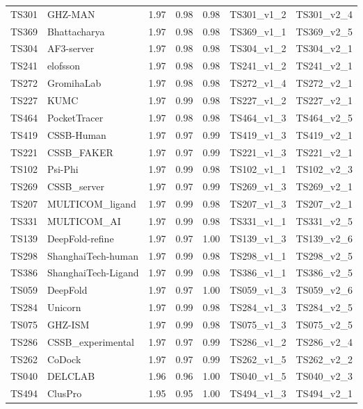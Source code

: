 \begin{table}[ht]
{\begin{tabular}{llrrrll}
TS301 & GHZ-MAN & 1.97 & 0.98 & 0.98 & TS301\_v1\_2 & TS301\_v2\_4 \\ 
TS369 & Bhattacharya & 1.97 & 0.98 & 0.98 & TS369\_v1\_1 & TS369\_v2\_5 \\ 
TS304 & AF3-server & 1.97 & 0.98 & 0.98 & TS304\_v1\_2 & TS304\_v2\_1 \\ 
TS241 & elofsson & 1.97 & 0.98 & 0.98 & TS241\_v1\_2 & TS241\_v2\_1 \\ 
TS272 & GromihaLab & 1.97 & 0.98 & 0.98 & TS272\_v1\_4 & TS272\_v2\_1 \\ 
TS227 & KUMC & 1.97 & 0.99 & 0.98 & TS227\_v1\_2 & TS227\_v2\_1 \\ 
TS464 & PocketTracer & 1.97 & 0.98 & 0.98 & TS464\_v1\_3 & TS464\_v2\_5 \\ 
TS419 & CSSB-Human & 1.97 & 0.97 & 0.99 & TS419\_v1\_3 & TS419\_v2\_1 \\ 
TS221 & CSSB\_FAKER & 1.97 & 0.97 & 0.99 & TS221\_v1\_3 & TS221\_v2\_1 \\ 
TS102 & Psi-Phi & 1.97 & 0.99 & 0.98 & TS102\_v1\_1 & TS102\_v2\_3 \\ 
TS269 & CSSB\_server & 1.97 & 0.97 & 0.99 & TS269\_v1\_3 & TS269\_v2\_1 \\ 
TS207 & MULTICOM\_ligand & 1.97 & 0.99 & 0.98 & TS207\_v1\_3 & TS207\_v2\_1 \\ 
TS331 & MULTICOM\_AI & 1.97 & 0.99 & 0.98 & TS331\_v1\_1 & TS331\_v2\_5 \\ 
TS139 & DeepFold-refine & 1.97 & 0.97 & 1.00 & TS139\_v1\_3 & TS139\_v2\_6 \\ 
TS298 & ShanghaiTech-human & 1.97 & 0.99 & 0.98 & TS298\_v1\_1 & TS298\_v2\_5 \\ 
TS386 & ShanghaiTech-Ligand & 1.97 & 0.99 & 0.98 & TS386\_v1\_1 & TS386\_v2\_5 \\ 
TS059 & DeepFold & 1.97 & 0.97 & 1.00 & TS059\_v1\_3 & TS059\_v2\_6 \\ 
TS284 & Unicorn & 1.97 & 0.99 & 0.98 & TS284\_v1\_3 & TS284\_v2\_5 \\ 
TS075 & GHZ-ISM & 1.97 & 0.99 & 0.98 & TS075\_v1\_3 & TS075\_v2\_5 \\ 
TS286 & CSSB\_experimental & 1.97 & 0.97 & 0.99 & TS286\_v1\_2 & TS286\_v2\_4 \\ 
TS262 & CoDock & 1.97 & 0.97 & 0.99 & TS262\_v1\_5 & TS262\_v2\_2 \\ 
TS040 & DELCLAB & 1.96 & 0.96 & 1.00 & TS040\_v1\_5 & TS040\_v2\_3 \\ 
TS494 & ClusPro & 1.95 & 0.95 & 1.00 & TS494\_v1\_3 & TS494\_v2\_1 \\ 

\end{tabular}}
\end{table}
